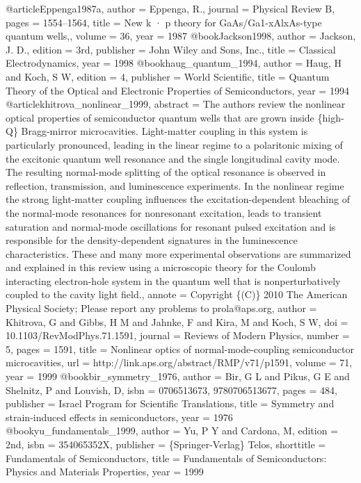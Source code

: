 @article{Eppenga1987a,
author = {Eppenga, R.},
journal = {Physical Review B},
pages = {1554--1564},
title = {{New k · p theory for GaAs/Ga1-xAlxAs-type quantum wells,}},
volume = {36},
year = {1987}
}
@book{Jackson1998,
author = {Jackson, J. D.},
edition = {3rd},
publisher = {John Wiley and Sons, Inc.},
title = {{Classical Electrodynamics}},
year = {1998}
}
@book{haug_quantum_1994,
author = {Haug, H and Koch, S W},
edition = {4},
publisher = {World Scientific},
title = {{Quantum Theory of the Optical and Electronic Properties of Semiconductors}},
year = {1994}
}
@article{khitrova_nonlinear_1999,
abstract = {The authors review the nonlinear optical properties of semiconductor quantum wells that are grown inside \{high-Q\} Bragg-mirror microcavities. Light-matter coupling in this system is particularly pronounced, leading in the linear regime to a polaritonic mixing of the excitonic quantum well resonance and the single longitudinal cavity mode. The resulting normal-mode splitting of the optical resonance is observed in reflection, transmission, and luminescence experiments. In the nonlinear regime the strong light-matter coupling influences the excitation-dependent bleaching of the normal-mode resonances for nonresonant excitation, leads to transient saturation and normal-mode oscillations for resonant pulsed excitation and is responsible for the density-dependent signatures in the luminescence characteristics. These and many more experimental observations are summarized and explained in this review using a microscopic theory for the Coulomb interacting electron-hole system in the quantum well that is nonperturbatively coupled to the cavity light field.},
annote = {Copyright \{(C)\} 2010 The American Physical Society; Please report any problems to prola@aps.org},
author = {Khitrova, G and Gibbs, H M and Jahnke, F and Kira, M and Koch, S W},
doi = {10.1103/RevModPhys.71.1591},
journal = {Reviews of Modern Physics},
number = {5},
pages = {1591},
title = {{Nonlinear optics of normal-mode-coupling semiconductor microcavities}},
url = {http://link.aps.org/abstract/RMP/v71/p1591},
volume = {71},
year = {1999}
}
@book{bir_symmetry_1976,
author = {Bir, G L and Pikus, G E and Shelnitz, P and Louvish, D},
isbn = {0706513673, 9780706513677},
pages = {484},
publisher = {Israel Program for Scientific Translations},
title = {{Symmetry and strain-induced effects in semiconductors}},
year = {1976}
}
@book{yu_fundamentals_1999,
author = {Yu, P Y and Cardona, M},
edition = {2nd},
isbn = {354065352X},
publisher = {\{Springer-Verlag\} Telos},
shorttitle = {Fundamentals of Semiconductors},
title = {{Fundamentals of Semiconductors: Physics and Materials Properties}},
year = {1999}
}

